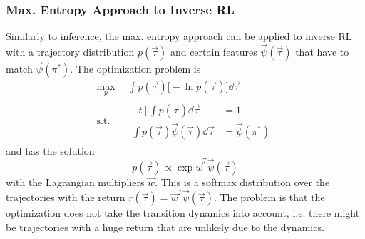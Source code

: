 			\subsubsection{Max. Entropy Approach to Inverse RL}
				Similarly to inference, the max. entropy approach can be applied to inverse RL with a trajectory distribution \( p(\vec{\tau}) \) and certain features \( \vec{\psi}(\vec{\tau}) \) that have to match \( \vec{\psi}(\pi^\ast) \). The optimization problem is
				\begin{equation*}
					\begin{aligned}
						\max_p \,& \int\! p(\vec{\tau}) \big[\! -\!\ln p(\vec{\tau}) \big] \dd{\vec{\tau}} \\
						\mathrm{s.t.} \quad&
							\begin{aligned}[t]
								\int\! p(\vec{\tau}) \dd{\vec{\tau}} &= 1 \\
								\int\! p(\vec{\tau}) \vec{\psi}(\vec{\tau}) \dd{\vec{\tau}} &= \vec{\psi}(\pi^\ast)
							\end{aligned}
					\end{aligned}
				\end{equation*}
				and has the solution
				\begin{equation*}
					p(\vec{\tau}) \propto \exp{ \vec{w}^T \vec{\psi}(\vec{\tau}) }
				\end{equation*}
				with the Lagrangian multipliers \(\vec{w}\). This is a softmax distribution over the trajectories with the return \( r(\vec{\tau}) = \vec{w}^T \vec{\psi}(\vec{\tau}) \). The problem is that the optimization does not take the transition dynamics into account, i.e. there might be trajectories with a huge return that are unlikely due to the dynamics.

